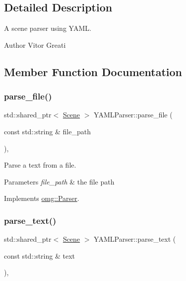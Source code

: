 \subsection{Detailed Description}
A scene parser using Y\+A\+ML. 

\begin{DoxyAuthor}{Author}
Vitor Greati 
\end{DoxyAuthor}


\subsection{Member Function Documentation}
\mbox{\label{classomg_1_1_y_a_m_l_parser_ab569d1029cec7dc2cb91eb0e08f5bc37}} 
\subsubsection{\texorpdfstring{parse\_file()}{parse\_file()}}
{\footnotesize\ttfamily std\+::shared\+\_\+ptr$<$ \mbox{\hyperlink{classomg_1_1_scene}{Scene}} $>$ Y\+A\+M\+L\+Parser\+::parse\+\_\+file (\begin{DoxyParamCaption}\item[{const std\+::string \&}]{file\+\_\+path }\end{DoxyParamCaption})\hspace{0.3cm}{\ttfamily [override]}, {\ttfamily [virtual]}}



Parse a text from a file. 


\begin{DoxyParams}{Parameters}
{\em file\+\_\+path} & the file path \\
\hline
\end{DoxyParams}


Implements \mbox{\hyperlink{classomg_1_1_parser_a327a60ea0092d0b969a3ec393248ca8f}{omg\+::\+Parser}}.

\mbox{\label{classomg_1_1_y_a_m_l_parser_a646b059fb458cbd5b9bc3a29c1f777f4}} 
\subsubsection{\texorpdfstring{parse\_text()}{parse\_text()}}
{\footnotesize\ttfamily std\+::shared\+\_\+ptr$<$ \mbox{\hyperlink{classomg_1_1_scene}{Scene}} $>$ Y\+A\+M\+L\+Parser\+::parse\+\_\+text (\begin{DoxyParamCaption}\item[{const std\+::string \&}]{text }\end{DoxyParamCaption})\hspace{0.3cm}{\ttfamily [override]}, {\ttfamily [virtual]}}



